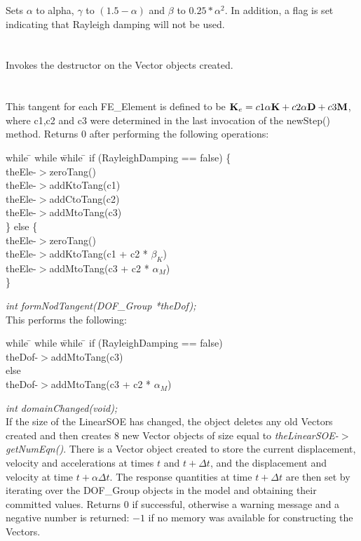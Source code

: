 Sets $\alpha$ to \p alpha, $\gamma$ to $(1.5 - \alpha)$ and $\beta$
to $0.25*\alpha^2$. In addition, a flag is set indicating that Rayleigh
damping will not be used. \\

 \\
\\ 
Invokes the destructor on the Vector objects created. \\

\\
 \\
This tangent for each FE\_Element is defined to be ${\bf K}_e = c1\alpha {\bf K}
+ c2\alpha {\bf D} + c3 {\bf M}$, where c1,c2 and c3 were determined in the last invocation
of the newStep() method. Returns $0$ after performing the
following operations:  
\begin{tabbing}
while \= \+ while \= while \= \kill
if (RayleighDamping == false) \{ \+ \\
theEle-$>$zeroTang() \\
theEle-$>$addKtoTang(c1) \\
theEle-$>$addCtoTang(c2) \\
theEle-$>$addMtoTang(c3)  \- \\
\} else \{ \+ \\
theEle-$>$zeroTang() \\
theEle-$>$addKtoTang(c1 + c2 * $\beta_K$) \\
theEle-$>$addMtoTang(c3 + c2 * $\alpha_M$)  \- \\ 
\}
\end{tabbing}

{\em int formNodTangent(DOF\_Group *theDof);} \\
This performs the following:
\begin{tabbing}
while \= \+ while \= while \= \kill
if (RayleighDamping == false)  \+ \\
theDof-$>$addMtoTang(c3)  \- \\
else \+ \\
theDof-$>$addMtoTang(c3 + c2 * $\alpha_M$)  \- \\ 
\end{tabbing}


{\em int domainChanged(void);}\\
If the size of the LinearSOE has changed, the object deletes any old Vectors
created and then creates $8$ new Vector objects of size equal to {\em
theLinearSOE-$>$getNumEqn()}. There is a Vector object created to store
the current displacement, velocity and accelerations at times $t$ and
$t + \Delta t$, and the displacement and velocity at time $t + \alpha
\Delta t$. The response quantities at time $t + \Delta t$ are
then set by iterating over the DOF\_Group objects in the model and
obtaining their committed values. 
Returns $0$ if successful, otherwise a warning message and a negative
number is returned: $-1$ if no memory was available for constructing
the Vectors. \\


